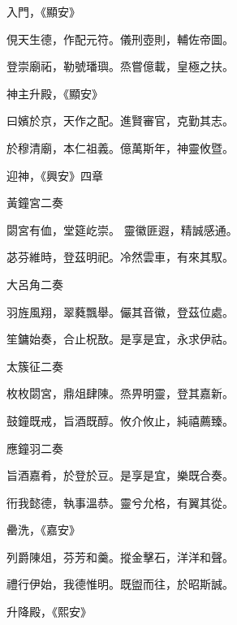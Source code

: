 \begin{pinyinscope}
 入門，《顯安》



 俔天生德，作配元符。儀刑壺則，輔佐帝圖。



 登崇廟祏，勒號璠璵。烝嘗億載，皇極之扶。



 神主升殿，《顯安》



 曰嬪於京，天作之配。進賢審官，克勤其志。



 於穆清廟，本仁祖義。億萬斯年，神靈攸暨。



 迎神，《興安》四章



 黃鐘宮二奏



 閟宮有侐，堂筵屹崇。
 靈徽匪遐，精誠感通。



 苾芬維時，登茲明祀。冷然雲車，有來其馭。



 大呂角二奏



 羽旌風翔，翠蕤飄舉。儼其音徽，登茲位處。



 笙鏞始奏，合止柷敔。是享是宜，永求伊祜。



 太簇征二奏



 枚枚閟宮，鼎俎肆陳。烝畀明靈，登其嘉新。



 鼓鐘既戒，旨酒既醇。攸介攸止，純禧薦臻。



 應鐘羽二奏



 旨酒嘉肴，於登於豆。是享是宜，樂既合奏。



 衎我懿德，執事溫恭。靈兮允格，有翼其從。



 罍洗，《嘉安》



 列爵陳俎，芬芳和羹。摐金擊石，洋洋和聲。



 禮行伊始，我德惟明。既盥而往，於昭斯誠。



 升降殿，《熙安》




\end{pinyinscope}
